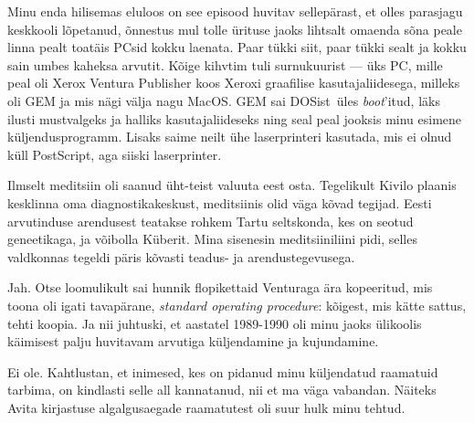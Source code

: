 Minu enda hilisemas eluloos on see episood huvitav sellepärast, et 
olles parasjagu keskkooli lõpetanud, õnnestus mul tolle ürituse jaoks lihtsalt 
omaenda sõna peale linna pealt toatäis PCsid kokku laenata. 
Paar tükki siit, paar tükki sealt ja kokku sain umbes kaheksa arvutit. Kõige kihvtim 
tuli surnukuurist --- üks PC, mille peal oli 
Xerox Ventura Publisher koos Xeroxi graafilise kasutajaliidesega, milleks oli 
GEM ja mis nägi välja nagu MacOS. GEM 
sai DOSist üles \emph{boot}'itud, läks ilusti mustvalgeks ja halliks 
kasutajaliideseks ning seal peal jooksis minu esimene küljendusprogramm. Lisaks
saime neilt ühe laserprinteri kasutada, mis ei olnud küll PostScript, aga siiski laserprinter. 


Ilmselt meditsiin oli saanud üht-teist valuuta eest 
osta. Tegelikult Kivilo plaanis kesklinna oma 
diagnostikakeskust, meditsiinis olid 
väga kõvad tegijad. Eesti arvutinduse arendusest teatakse rohkem Tartu
seltskonda, kes on seotud geneetikaga, ja võibolla 
Küberit. Mina sisenesin meditsiiniliini pidi, selles 
valdkonnas tegeldi päris kõvasti teadus- ja arendustegevusega. 


Jah. Otse loomulikult sai hunnik flopikettaid Venturaga ära kopeeritud, mis toona oli igati tavapärane, \emph{standard operating 
procedure}: kõigest, mis kätte sattus, tehti koopia. Ja nii juhtuski, 
et aastatel 1989-1990 oli minu jaoks ülikoolis käimisest palju 
huvitavam arvutiga küljendamine ja kujundamine. 


Ei ole. Kahtlustan, et inimesed, kes on pidanud minu küljendatud raamatuid 
tarbima, on kindlasti selle all kannatanud, nii et ma väga vabandan. Näiteks
Avita kirjastuse algalgusaegade raamatutest oli suur hulk 
minu tehtud.

